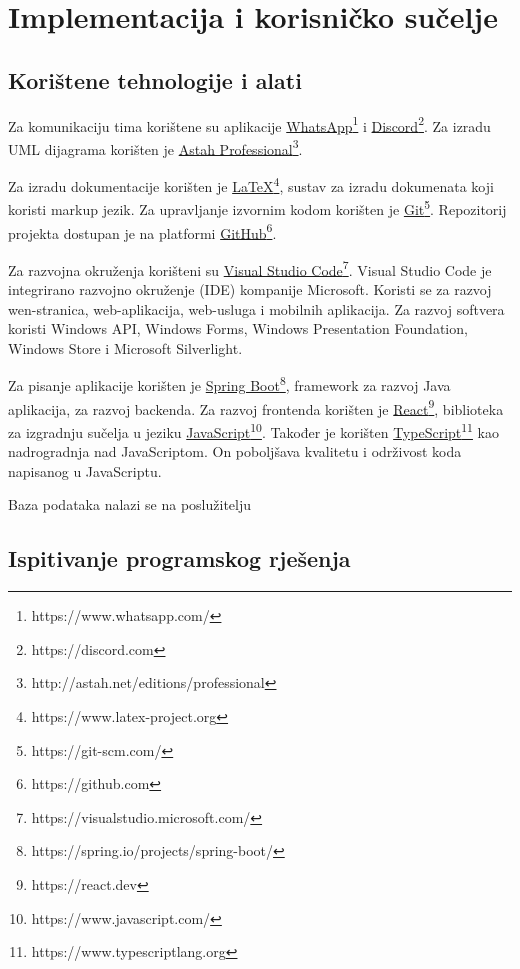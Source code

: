 \chapter{Implementacija i korisničko sučelje}


\section{Korištene tehnologije i alati}

\noindent Za komunikaciju tima korištene su aplikacije \underline{WhatsApp}\footnote{https://www.whatsapp.com/} i \underline{Discord}\footnote{https://discord.com}. Za izradu UML dijagrama korišten je \underline{Astah Professional}\footnote{http://astah.net/editions/professional}.

Za izradu dokumentacije korišten je \underline{LaTeX}\footnote{https://www.latex-project.org}, sustav za izradu dokumenata koji koristi markup jezik. Za upravljanje izvornim kodom korišten je \underline{Git}\footnote{https://git-scm.com/}. Repozitorij projekta dostupan je na platformi \underline{GitHub}\footnote{https://github.com}.

Za razvojna okruženja korišteni su \underline{Visual Studio Code}\footnote{https://visualstudio.microsoft.com/}. Visual Studio Code je integrirano razvojno okruženje (IDE) kompanije Microsoft. Koristi se za razvoj wen-stranica, web-aplikacija, web-usluga i mobilnih aplikacija. Za razvoj softvera koristi Windows API, Windows Forms, Windows Presentation Foundation, Windows Store i Microsoft Silverlight.

Za pisanje aplikacije korišten je \underline{Spring Boot}\footnote{https://spring.io/projects/spring-boot/}, framework za razvoj Java aplikacija, za razvoj backenda. Za razvoj frontenda korišten je \underline{React}\footnote{https://react.dev}, biblioteka za izgradnju sučelja u jeziku \underline{JavaScript}\footnote{https://www.javascript.com/}. Također je korišten \underline{TypeScript}\footnote{https://www.typescriptlang.org} kao nadrogradnja nad JavaScriptom. On poboljšava kvalitetu i održivost koda napisanog u JavaScriptu.

Baza podataka nalazi se na poslužitelju 

\eject


\section{Ispitivanje programskog rješenja}


